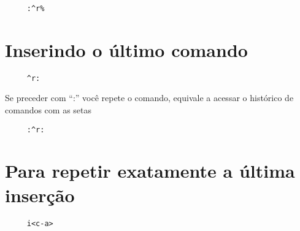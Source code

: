 \begin{verbatim}
     :^r%
\end{verbatim}

\section{Inserindo o último comando }

\begin{verbatim}
     ^r:
\end{verbatim}

Se preceder com ``:'' você repete o comando, equivale a acessar o histórico de
comandos com as setas

\begin{verbatim}
     :^r:
\end{verbatim}

\section{Para repetir exatamente a última inserção }

\begin{verbatim}
     i<c-a>
\end{verbatim}
